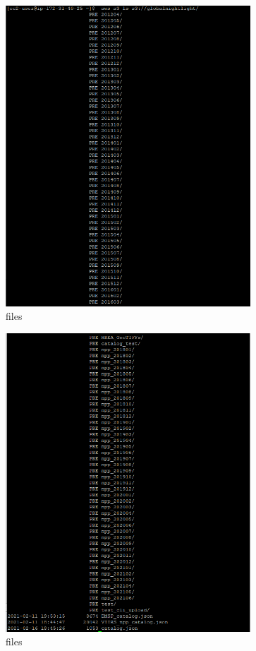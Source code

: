 \documentclass[conference]{IEEEtran}
\begin{document}
\begin{figure}[htbp]
    \centerline{\includegraphics[width=260pt]{images/3.1.png}}
    \caption{files}
    \label{satellite2}
\end{figure}

\begin{figure}[htbp]
    \centerline{\includegraphics[width=260pt]{images/3.2.png}}
    \caption{files}
    \label{satellite}
\end{figure}
\end{document}
